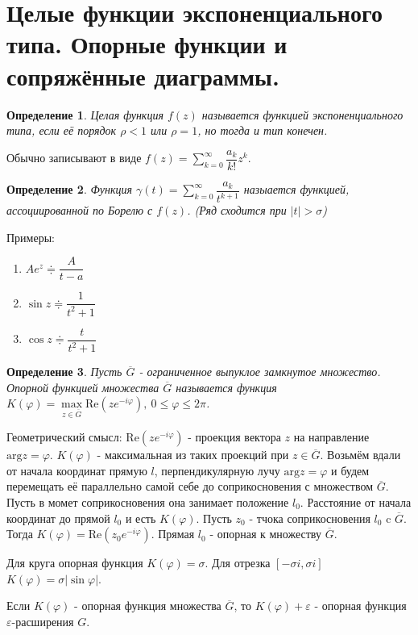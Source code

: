 \documentclass[9pt]{article}
\newtheorem{definition}{Определение}
\begin{document}
		\section{Целые функции экспоненциального типа. Опорные функции и сопряжённые диаграммы.}
			\begin{definition}
				Целая функция $f(z)$ называется функцией экспоненциального типа, если её порядок $\rho < 1$ или $\rho = 1$, но тогда и тип конечен.
			\end{definition}
			Обычно записывают в виде $f(z) = \sum\limits_{k=0}^{\infty} \dfrac{a_k}{k!} z^k$.
			\begin{definition}
				Функция $\gamma(t) = \sum\limits_{k=0}^{\infty} \dfrac{a_k}{t^{k+1}}$ назыается функцией, ассоциированной по Борелю с $f(z)$. (Ряд сходится при $|t| > \sigma$)
			\end{definition}
			Примеры:
			\begin{enumerate}
				\item $Ae^z \doteqdot \dfrac{A}{t-a}$
				\item $\sin{z} \doteqdot \dfrac{1}{t^2 + 1}$
				\item $\cos{z}  \doteqdot \dfrac{t}{t^2+1}$
			\end{enumerate}
			\begin{definition}
				Пусть $\overline{G}$ - ограниченное выпуклое замкнутое множество. Опорной функцией множества $\overline{G}$ называется функция $K(\varphi) = \max\limits_{z \in \overline{G}} \mathrm{Re}(z e^{-i\varphi}), \ 0 \leq \varphi \leq 2\pi$.
			\end{definition}
			Геометрический смысл: $\mathrm{Re}(z e^{-i\varphi})$ - проекция вектора $z$ на направление $\mathrm{arg} z = \varphi$. $K(\varphi)$ - максимальная из таких проекций при $z \in \overline{G}$. Возьмём вдали от начала координат прямую $l$, перпендикулярную лучу $\mathrm{arg} z= \varphi$ и будем перемещать её параллельно самой себе до соприкосновения с множеством $\overline{G}$. Пусть в момет соприкосновения она занимает положение $l_0$. Расстояние от начала координат до прямой $l_0$ и есть $K(\varphi)$. Пусть $z_0$ - тчока соприкосновения $l_0$ c $\overline{G}$. Тогда $K(\varphi) = \mathrm{Re} (z_0 e^{-i\varphi})$. Прямая $l_0$ - опорная к множеству $\overline{G}$.
			
			Для круга опорная функция $K(\varphi) = \sigma$. Для отрезка $[-\sigma i, \sigma i]$ $K(\varphi) = \sigma |\sin{\varphi}|$.
			
			Если $K(\varphi)$ - опорная функция множества  $\overline{G}$, то $K(\varphi) + \varepsilon$ - опорная функция $\varepsilon$-расширения $G$.
			
\end{document}
